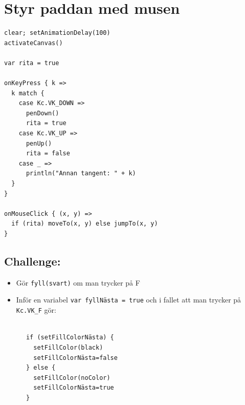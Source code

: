 \chapter{Styr paddan med musen}
\begin{multicols}{2}

\begin{lstlisting}[basicstyle={\ttfamily\fontsize{16}{19}\selectfont},numbers=none]
clear; setAnimationDelay(100)
activateCanvas()

var rita = true

onKeyPress { k =>
  k match {
    case Kc.VK_DOWN => 
      penDown()
      rita = true
    case Kc.VK_UP => 
      penUp()
      rita = false
    case _ => 
      println("Annan tangent: " + k)
  }
}

onMouseClick { (x, y) =>
  if (rita) moveTo(x, y) else jumpTo(x, y)
}
\end{lstlisting}
        


\columnbreak


\section*{\color{BrickRed}Challenge:}


\begin{itemize}

\item {Gör \lstinline{fyll(svart)} om man trycker på F}
\item {Inför en variabel \lstinline{var fyllNästa = true} och i fallet att man trycker på \lstinline{Kc.VK_F} gör:}

\end{itemize}



\begin{lstlisting}[numbers=none]

      if (setFillColorNästa) {
        setFillColor(black)
        setFillColorNästa=false
      } else {
        setFillColor(noColor)
        setFillColorNästa=true
      }
      
\end{lstlisting}
        
\end{multicols}

